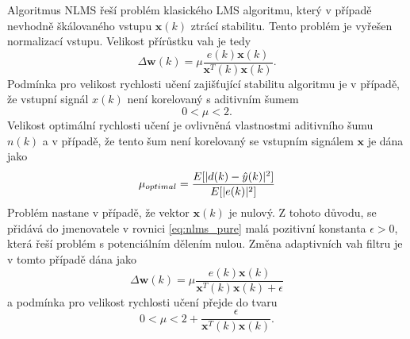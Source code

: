 \par 
Algoritmus NLMS řeší problém klasického LMS algoritmu, který v případě nevhodně škálovaného vstupu $\textbf{x}(k)$ ztrácí stabilitu. Tento problém je vyřešen normalizací vstupu. Velikost přírůstku vah je tedy
\begin{equation}\label{eq:nlms_pure}
    \Delta \textbf{w}(k)=\mu\frac{e(k)\textbf{x}(k)}{\textbf{x}^T(k)\textbf{x}(k)}.
\end{equation}
Podmínka pro velikost rychlosti učení zajišťující stabilitu algoritmu je v případě, že vstupní signál $x(k)$ není korelovaný s aditivním šumem
\begin{equation}
0 < \mu < 2.
\end{equation}
Velikost optimální rychlosti učení je ovlivněná vlastnostmi aditivního šumu $n(k)$ a v případě, že tento šum není korelovaný se vstupním signálem $\textbf{x}$ je dána jako
\begin{equation}
    \mu_{optimal}=\frac{E[\lvert d(k)-\hat{y}(k)\rvert^2]}{E[\lvert e(k)\rvert^2]}
\end{equation}
Problém nastane v případě, že vektor $\textbf{x}(k)$ je nulový. Z tohoto důvodu, se přidává do jmenovatele v rovnici \ref{eq:nlms_pure} malá pozitivní konstanta $\epsilon > 0$, která řeší problém s potenciálním dělením nulou. Změna adaptivních vah filtru je v tomto případě dána jako
\begin{equation}\label{eq:nlms_adapt}
    \Delta \textbf{w}(k)=\mu\frac{e(k)\textbf{x}(k)}{\textbf{x}^T(k)\textbf{x}(k)+\epsilon}
\end{equation}
a podmínka pro velikost rychlosti učení přejde do tvaru
\begin{equation}
    0 < \mu < 2 + \frac{\epsilon}{\textbf{x}^T(k)\textbf{x}(k)}.
\end{equation}
